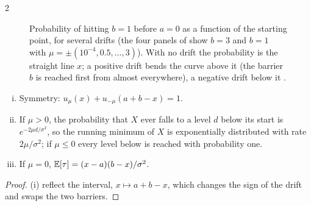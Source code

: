\begin{paracol}{2}
\begin{figure}[ht]
\centering
{}
\caption{Probability of hitting $b=1$ before $a=0$ as a function of the starting point, for several drifts (the four panels of
 show $b=3$ and $b=1$ with $\mu=\pm(10^{-4},0.5,\dots,3)$). With no drift the probability is the straight line
$x$; a positive drift bends the curve above it (the barrier $b$ is reached first from almost everywhere), a negative drift below it
.}\label{ch11:fig-ruin}
\end{figure}

\begin{proposition}\label{ch11:prop-ruincons}
\leavevmode
\begin{enumerate}[(i)]
  \item Symmetry: $u_\mu(x)+u_{-\mu}(a+b-x)=1$.
  \item If $\mu>0$, the probability that $X$ ever falls to a level $d$ below its start is $e^{-2\mu d/\sigma^2}$,
      so the running minimum of $X$ is exponentially distributed with rate $2\mu/\sigma^2$; if $\mu\le0$ every level below is
      reached with probability one.
  \item If $\mu=0$, $\mathbb{E}[\tau]=(x-a)(b-x)/\sigma^2$.
\end{enumerate}
\end{proposition}
\begin{proof}
(i) reflect the interval, $x\mapsto a+b-x$, which changes the sign of the drift and swaps the two barriers.


\end{proof}
\end{paracol}
